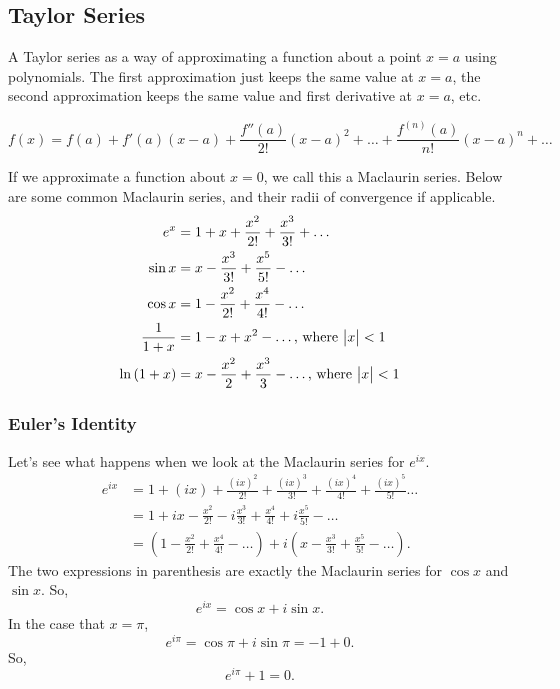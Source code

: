 \subsection{Taylor Series}
\noindent
A Taylor series as a way of approximating a function about a point $x=a$ using polynomials.
The first approximation just keeps the same value at $x=a$, the second approximation keeps the same value and first derivative at $x=a$, etc.
\begin{definition}
	\begin{equation*}
		f(x) = f(a)+f'(a)(x-a) + \frac{f''(a)}{2!}(x-a)^2 + \ldots +  \frac{f^{(n)}(a)}{n!}(x-a)^n + \ldots
	\end{equation*}
\end{definition}

\noindent
If we approximate a function about $x=0$, we call this a Maclaurin series. Below are some common Maclaurin series, and their radii of convergence if applicable.
\begin{align*}
	e^x &= 1 + x + \frac{x^2}{2!} + \frac{x^3}{3!} + \ldots \\
	\sin{x} &= x - \frac{x^3}{3!} + \frac{x^5}{5!} - \ldots \\
	\cos{x} &= 1 - \frac{x^2}{2!} + \frac{x^4}{4!} - \ldots \\
	\frac{1}{1+x} &= 1 - x + x^2 - \ldots \text{, where } \big\lvert x \big\rvert < 1 \\
	\ln{(1+x)} &= x - \frac{x^2}{2} + \frac{x^3}{3} - \ldots \text{, where } \big\lvert x \big\rvert < 1
\end{align*}

\subsubsection{Euler's Identity}
\noindent
Let's see what happens when we look at the Maclaurin series for $e^{ix}$.
\begin{align*}
	e^{ix} &= 1 + (ix) + \frac{(ix)^2}{2!} + \frac{(ix)^3}{3!} + \frac{(ix)^4}{4!} + \frac{(ix)^5}{5!} \ldots \\
	&= 1 + ix - \frac{x^2}{2!} - i\frac{x^3}{3!} + \frac{x^4}{4!} + i\frac{x^5}{5!} - \ldots \\
	&= \left(1 - \frac{x^2}{2!} + \frac{x^4}{4!} - \ldots \right) + i\left(x - \frac{x^3}{3!} + \frac{x^5}{5!} - \ldots \right).
\end{align*}
The two expressions in parenthesis are exactly the Maclaurin series for $\cos{x}$ and $\sin{x}$. So,
\begin{equation*}
	e^{ix} = \cos{x} + i\sin{x}.
\end{equation*}
In the case that $x = \pi$,
\begin{equation*}
	e^{i\pi} = \cos{\pi} + i\sin{\pi} = -1 + 0.
\end{equation*}
So,
\begin{equation*}
	e^{i\pi} + 1 = 0.
\end{equation*}
